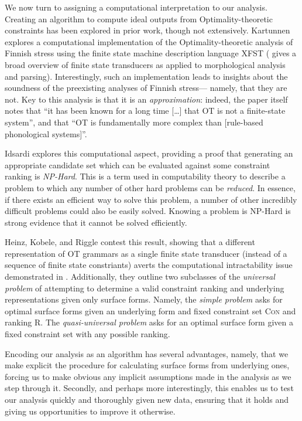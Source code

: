 \documentclass[12pt]{article}
\begin{document}
We now turn to assigning a computational interpretation to our analysis.
Creating an algorithm to compute ideal outputs from Optimality-theoretic
constraints has been explored in prior work, though not extensively. Kartunnen
\cite{karttunen2006finite} explores a computational implementation of the
Optimality-theoretic analysis of Finnish stress using the finite state machine
description language XFST (\cite{karttunen2001applications} gives a broad
overview of finite state transducers as applied to morphological analysis and
parsing). Interestingly, such an implementation leads to insights about the
soundness of the preexisting analyses of Finnish stress--- namely, that they
are not. Key to this analysis is that it is an \textit{approximation}: indeed,
the paper itself notes that ``it has been known for a long time [\ldots] that
\textsc{OT} is not a finite-state system'', and that ``\textsc{OT} is
fundamentally more complex than [rule-based phonological systems]''.

Idsardi \cite{idsardi2006simple} explores this computational aspect, providing
a proof that generating an appropriate candidate set which can be evaluated
against some constraint ranking is \textit{NP-Hard}. This is a term used in
computability theory to describe a problem to which any number of other hard
problems can be \textit{reduced}. In essence, if there exists an efficient way
to solve this problem, a number of other incredibly difficult problems could
also be easily solved. Knowing a problem is NP-Hard is strong evidence that it
cannot be solved efficiently.

Heinz, Kobele, and Riggle \cite{heinz2009evaluating} contest this result,
showing that a different representation of \textsc{OT} grammars as a single
finite state transducer (instead of a sequence of finite state constriants)
averts the computational intractability issue demonstrated in
\cite{idsardi2006simple}. Additionally, they outline two subclasses of the
\textit{universal problem} of attempting to determine a valid constraint
ranking and underlying representations given only surface forms. Namely,
the \textit{simple problem} asks for optimal surface forms given an underlying
form and fixed constraint set \textsc{Con} and ranking \textsc{R}. The
\textit{quasi-universal problem} asks for an optimal surface form given
a fixed constraint set with any possible ranking.

Encoding our analysis as an algorithm has several advantages, namely, that we
make explicit the procedure for calculating surface forms from underlying ones,
forcing us to make obvious any implicit assumptions made in the analysis as we
step through it. Secondly, and perhaps more interestingly, this enables us to
test our analysis quickly and thoroughly given new data, ensuring that it holds
and giving us opportunities to improve it otherwise.
\end{document}
